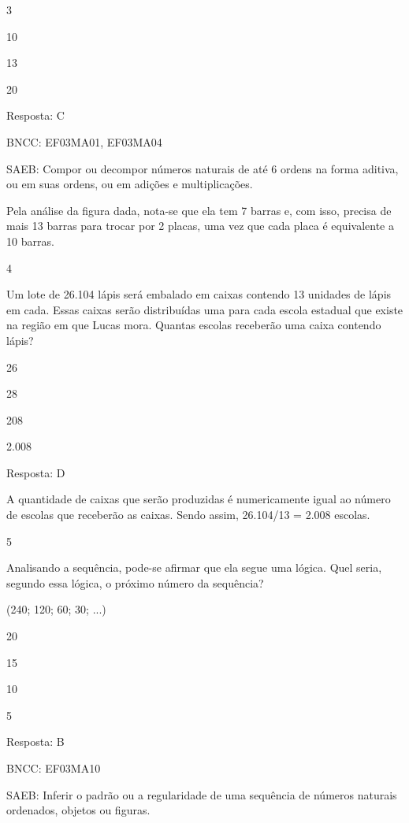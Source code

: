 \begin{escolha}
{\begin{escolha}
{\begin{escolha}
\item
  3
\item
  10
\item
  13
\item
  20
\end{escolha}

Resposta: C

BNCC: EF03MA01, EF03MA04

SAEB: Compor ou decompor números naturais de até 6 ordens na
forma aditiva, ou em suas ordens, ou em adições e multiplicações.

Pela análise da figura dada, nota-se que ela tem 7 barras e, com isso,
precisa de mais 13 barras para trocar por 2 placas, uma vez que cada
placa é equivalente a 10 barras.

\num{4}

Um lote de 26.104 lápis será embalado em caixas contendo 13 unidades de
lápis em cada. Essas caixas serão distribuídas uma para cada escola
estadual que existe na região em que Lucas mora. Quantas escolas
receberão uma caixa contendo lápis?

\begin{escolha}
\item
  26
\item
  28
\item
  208
\item
  2.008
\end{escolha}

Resposta: D

A quantidade de caixas que serão produzidas é numericamente igual ao número de
escolas que receberão as caixas. Sendo assim, 26.104/13 = 2.008 escolas.

\num{5}

Analisando a sequência, pode-se afirmar que ela segue uma lógica. Quel seria, segundo essa lógica, o próximo número da sequência?

(240; 120; 60; 30; ...)

\begin{escolha}
\item
  20
\item
  15
\item
  10
\item
  5
\end{escolha}

Resposta: B

BNCC: EF03MA10

SAEB: Inferir o padrão ou a regularidade de uma sequência de
números naturais ordenados, objetos ou figuras.

}
\end{escolha}}
\end{escolha}
